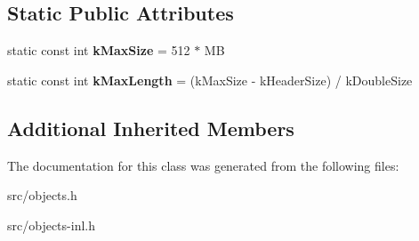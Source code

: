\subsection*{Static Public Attributes}
\begin{DoxyCompactItemize}
\item 
\hypertarget{classv8_1_1internal_1_1_fixed_double_array_a857be21c642353c126dddfd6dd2e672b}{}static const int {\bfseries k\+Max\+Size} = 512 $\ast$ M\+B\label{classv8_1_1internal_1_1_fixed_double_array_a857be21c642353c126dddfd6dd2e672b}

\item 
\hypertarget{classv8_1_1internal_1_1_fixed_double_array_af65b3ad9319ef84e8ae0f878b7556d92}{}static const int {\bfseries k\+Max\+Length} = (k\+Max\+Size -\/ k\+Header\+Size) / k\+Double\+Size\label{classv8_1_1internal_1_1_fixed_double_array_af65b3ad9319ef84e8ae0f878b7556d92}

\end{DoxyCompactItemize}
\subsection*{Additional Inherited Members}


The documentation for this class was generated from the following files\+:\begin{DoxyCompactItemize}
\item 
src/objects.\+h\item 
src/objects-\/inl.\+h\end{DoxyCompactItemize}
